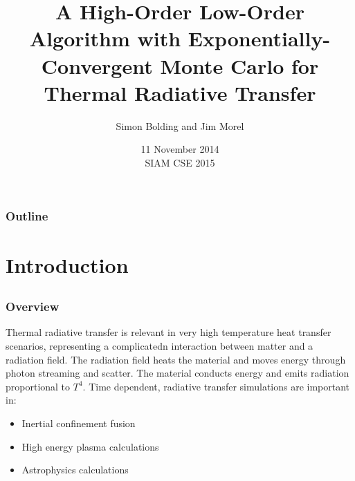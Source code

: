 \documentclass[xcolor=dvipsnames,handout,hyperref={pdfpagelabels=false}]{beamer}
\title{A High-Order Low-Order Algorithm with Exponentially-Convergent Monte Carlo for
    Thermal Radiative Transfer}
\author{{\large Simon Bolding and Jim Morel}}
\date{11 November 2014 \\ \vspace{0.05in} {SIAM CSE 2015}}
\newlength{\wideitemsep}
\let\olditem\item
\renewcommand{\item}{\setlength{\itemsep}{\wideitemsep}\olditem}
\begin{document}
\begin{frame}
    \titlepage \vspace{-0.213in}
    \begin{center}
    \end{center}    
\end{frame}

\setlength{\tabcolsep}{6pt}

\begin{frame}
\frametitle{Outline}
\begin{minipage}{0.061\linewidth}
\hfill                      
\end{minipage}
\begin{minipage}{0.8\linewidth}
\tableofcontents[
hideothersubsections,
sectionstyle=show,
subsectionstyle=hide
]
\end{minipage}

\end{frame}


\section{Introduction}
\subsection{}

\begin{frame}
\frametitle{Overview}
Thermal radiative transfer is relevant in very high temperature heat transfer
scenarios, representing a complicatedn interaction
between matter and a radiation field. The radiation field heats the material and
moves energy through photon streaming and scatter. The material conducts energy and
emits radiation proportional to $T^4$. Time dependent, radiative transfer simulations
are important in:

\begin{itemize}
\item Inertial confinement fusion
\item High energy plasma calculations
\item Astrophysics calculations
\end{itemize}
\end{frame}
\end{document}
